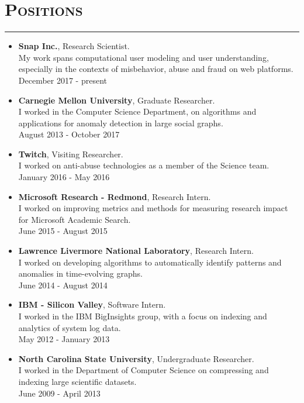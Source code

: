 \documentclass{article}
\newcommand{\HRule}{\rule{\linewidth}{0.5mm}}
\begin{document}
\section*{\bf \textsc{Positions}}
\vspace{-5mm}\HRule
\begin{itemize}
\item {\bf Snap Inc.}, Research Scientist. \\ My work spans computational user modeling and user understanding, especially in the contexts of misbehavior, abuse and fraud on web platforms. \\ December 2017 - present
\item {\bf Carnegie Mellon University}, Graduate Researcher. \\ I worked in the Computer Science Department, on algorithms and applications for anomaly detection in large social graphs. \\ August 2013 - October 2017
\item {\bf Twitch}, Visiting Researcher. \\  I worked on anti-abuse technologies as a member of the Science team.  \\ January 2016 - May 2016
\item {\bf Microsoft Research - Redmond}, Research Intern. \\  I worked on improving metrics and methods for measuring research impact for Microsoft Academic Search.  \\ June 2015 - August 2015
\item {\bf Lawrence Livermore National Laboratory}, Research Intern. \\  I worked on developing algorithms to automatically identify patterns and anomalies in time-evolving graphs. \\ June 2014 - August 2014
\item {\bf IBM - Silicon Valley}, Software Intern. \\ I worked in the IBM BigInsights group, with a focus on indexing and analytics of system log data.  \\ May 2012 - January 2013
\item {\bf North Carolina State University}, Undergraduate Researcher. \\ I worked in the Department of Computer Science on compressing and indexing large scientific datasets. \\ June 2009 - April 2013
\end{itemize}
\end{document}
